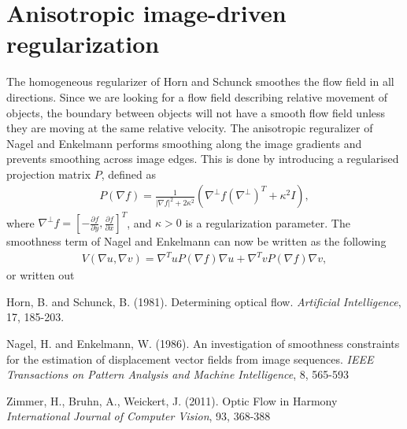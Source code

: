 \documentclass[10pt,a4paper]{article}
\begin{document}
\section{Anisotropic image-driven regularization}
The homogeneous regularizer of Horn and Schunck smoothes the flow field in all directions. Since we are looking for a flow field describing relative movement of objects, the boundary between objects will not have a smooth flow field unless they are moving at the same relative velocity. The anisotropic reguralizer of Nagel and Enkelmann \cite{NE} performs smoothing along the image gradients and prevents smoothing across image edges. This is done by introducing a regularised projection matrix $P$, defined as
\begin{align*}
P(\nabla f) = \frac{1}{|\nabla f|^2 + 2 \kappa^2} (\nabla^{\bot} f (\nabla^{\bot})^T + \kappa^2 I),
\end{align*}
where $\nabla^{\bot} f= \left[-\frac{\partial f}{\partial y}, \frac{\partial f}{\partial x}\right]^T$, and $\kappa > 0$ is a regularization parameter. The smoothness term of Nagel and Enkelmann can now be written as the following
\begin{align*}
V(\nabla u, \nabla v) = \nabla ^T u P(\nabla f) \nabla u + \nabla ^T v P(\nabla f) \nabla v,
\end{align*}
or written out 

\begin{thebibliography}{}

Horn, B. and Schunck, B. (1981). Determining optical flow. \emph{Artificial Intelligence}, 17, 185-203.

Nagel, H. and Enkelmann, W. (1986). An investigation of smoothness constraints for the estimation of displacement vector fields from image sequences. \emph{IEEE Transactions on Pattern Analysis and Machine Intelligence}, 8, 565-593

Zimmer, H., Bruhn, A., Weickert, J. (2011). Optic Flow in Harmony \emph{International Journal of Computer Vision}, 93, 368-388


\end{thebibliography}
\end{document}
